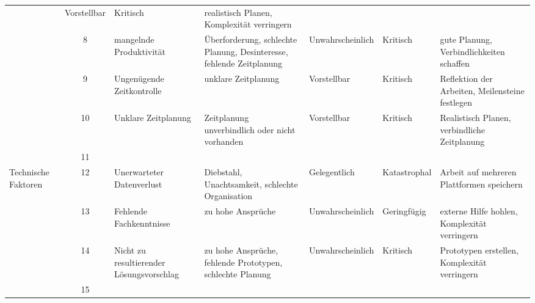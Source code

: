 \begin{landscape}
\begin{table}[h!]
\begin{tabular}{p{} c p{} p{} p{} p{} p{}}
            & Vorstellbar 
            & Kritisch 
            & realistisch Planen, Komplexität verringern \\
	    \rowcolor{yellow}
            & 8 
            & mangelnde Produktivität 
            & Überforderung, schlechte Planung, Desinteresse, fehlende Zeitplanung 
            & Unwahrscheinlich 
            & Kritisch 
            & gute Planung, Verbindlichkeiten schaffen \\
        \rowcolor{yellow}
	        & 9 
            & Ungenügende Zeitkontrolle 
            & unklare Zeitplanung 
            & Vorstellbar 
            & Kritisch 
            & Reflektion der Arbeiten, Meilensteine festlegen \\
        \rowcolor{yellow}
	        & 10 
            & Unklare Zeitplanung 
            & Zeitplanung unverbindlich oder nicht vorhanden 
            & Vorstellbar 
            & Kritisch 
            & Realistisch Planen, verbindliche Zeitplanung \\
        \rowcolor{yellow}
	        & 11 
            & 
            & 
            & 
            & 
            & \\
        \rowcolor{red} Technische Faktoren 
            & 12 
            & Unerwarteter Datenverlust 
            & Diebstahl, Unachtsamkeit, schlechte Organisation 
            & Gelegentlich 
            & Katastrophal 
            & Arbeit auf mehreren Plattformen speichern \\
        \rowcolor{green} 
            & 13 
            & Fehlende Fachkenntnisse 
            & zu hohe Ansprüche 
            & Unwahrscheinlich 
            & Geringfügig 
            & externe Hilfe hohlen, Komplexität verringern \\
        \rowcolor{yellow}
	        & 14 
            & Nicht zu resultierender Lösungsvorschlag 
            & zu hohe Ansprüche, fehlende Prototypen, schlechte Planung 
            & Unwahrscheinlich 
            & Kritisch 
            & Prototypen erstellen, Komplexität verringern \\
        \rowcolor{yellow} 
            & 15 
            & 
            & 
            & 
            & 
            & \\
	\end{tabular}
\end{table}
\end{landscape}
